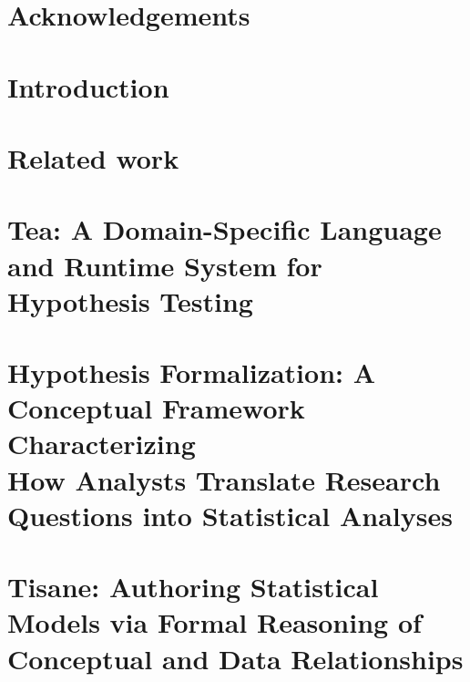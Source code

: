 \documentclass[11pt]{book}
\begin{document}
% 






{} %



\chapter*{Acknowledgements}



\tableofcontents{}
\listoffigures
\listoftables
\clearpage

\chapter {Introduction}


\chapter {Related work}
\label{chapter:relatedWork}


\chapter{Tea: A Domain-Specific Language and Runtime System for Hypothesis Testing} %
\label{chapter:tea}


\chapter{Hypothesis Formalization: A Conceptual Framework Characterizing\\How Analysts Translate Research Questions into Statistical Analyses} %
\label{chapter:hypoForm}


\chapter{Tisane: Authoring Statistical Models via Formal Reasoning of Conceptual and Data Relationships}
\label{chapter:tisane}


% 
\end{document}
